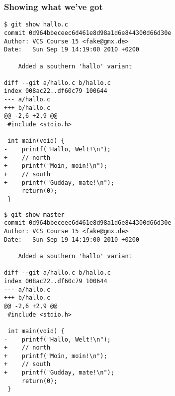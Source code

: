 \begin{frame}[fragile]
\frametitle{Showing what we've got}

\begin{multicols}{2}
\begin{lstlisting}[basicstyle=\tiny\ttfamily\color{black}]
$ git show hallo.c
commit 0d964bbeceec6d461e8d98a1d6e844300d66d30e
Author: VCS Course 15 <fake@gmx.de>
Date:   Sun Sep 19 14:19:00 2010 +0200

    Added a southern 'hallo' variant

diff --git a/hallo.c b/hallo.c
index 008ac22..df60c79 100644
--- a/hallo.c
+++ b/hallo.c
@@ -2,6 +2,9 @@
 #include <stdio.h>
 
 int main(void) {
-    printf("Hallo, Welt!\n");
+    // north
+    printf("Moin, moin!\n");
+    // south
+    printf("Gudday, mate!\n");
     return(0);
 }
\end{lstlisting}
\columnbreak
\begin{lstlisting}[basicstyle=\tiny\ttfamily\color{black}]
$ git show master
commit 0d964bbeceec6d461e8d98a1d6e844300d66d30e
Author: VCS Course 15 <fake@gmx.de>
Date:   Sun Sep 19 14:19:00 2010 +0200

    Added a southern 'hallo' variant

diff --git a/hallo.c b/hallo.c
index 008ac22..df60c79 100644
--- a/hallo.c
+++ b/hallo.c
@@ -2,6 +2,9 @@
 #include <stdio.h>
 
 int main(void) {
-    printf("Hallo, Welt!\n");
+    // north
+    printf("Moin, moin!\n");
+    // south
+    printf("Gudday, mate!\n");
     return(0);
 }
\end{lstlisting}
\end{multicols}

\end{frame}

